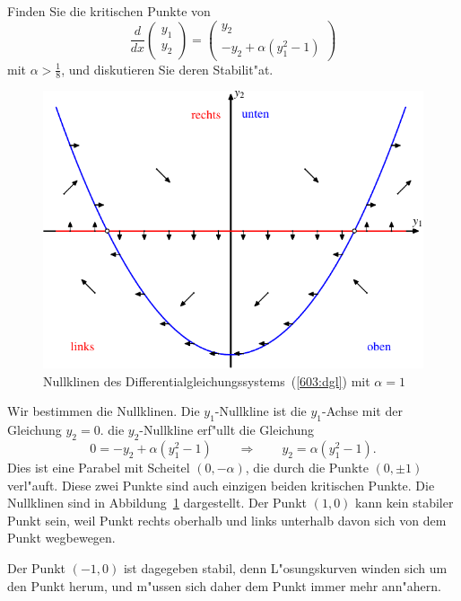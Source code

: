 Finden Sie die kritischen Punkte von 
\begin{equation}
\frac{d}{dx}\begin{pmatrix}y_1\\y_2\end{pmatrix}
=
\begin{pmatrix}
y_2\\
-y_2+\alpha(y_1^2-1)
\end{pmatrix}
\label{603:dgl}
\end{equation}
mit $\alpha > \frac18$, und diskutieren Sie deren Stabilit"at.

\begin{loesung}
\begin{figure}
\centering
\includegraphics{../skript/uebungsaufgaben/603-1.pdf}
\caption{Nullklinen des Differentialgleichungssystems~(\ref{603:dgl})
mit $\alpha=1$
\label{603:nullklinen}}
\end{figure}
Wir bestimmen die Nullklinen.
Die $y_1$-Nullkline ist die $y_1$-Achse mit der Gleichung $y_2=0$.
die $y_2$-Nullkline erf"ullt die Gleichung
\[
0=-y_2+\alpha(y_1^2-1)
\qquad\Rightarrow\qquad
y_2=\alpha(y_1^2-1).
\]
Dies ist eine Parabel mit Scheitel $(0,-\alpha)$, die durch die Punkte
$(0,\pm1)$ verl"auft.
Diese zwei Punkte sind auch einzigen beiden kritischen Punkte.
Die Nullklinen sind in Abbildung~\ref{603:nullklinen} dargestellt.
Der Punkt $(1,0)$ kann kein stabiler Punkt sein, weil Punkt rechts
oberhalb und links unterhalb davon sich von dem Punkt wegbewegen.

Der Punkt $(-1,0)$ ist dagegeben stabil, denn L"osungskurven winden
sich um den Punkt herum, und m"ussen sich daher dem Punkt immer
mehr ann"ahern.


\end{loesung}
